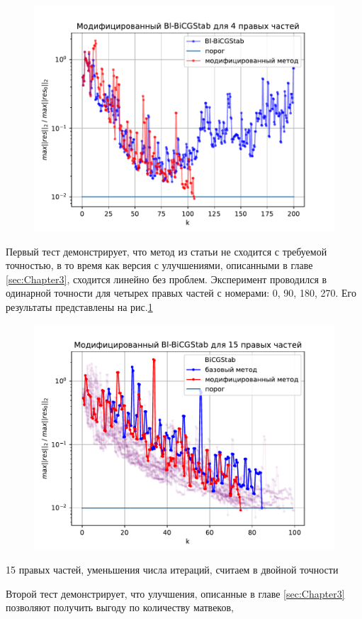 \begin{figure}[H]
    \centering
    \includegraphics[width=0.7\linewidth]{images/4.pdf}
    \caption{}
    \label{fig:4}
\end{figure} 
\par Первый тест демонстрирует, что метод из статьи \cite{elGuennouni2003} не сходится с требуемой точностью, в то время как 
версия с улучшениями, описанными в главе \ref{sec:Chapter3}, сходится линейно без проблем. 
Эксперимент проводился в одинарной точности для четырех правых частей с номерами: 0, 90, 180, 270. Его результаты представлены
на рис.\ref{fig:4}
\begin{figure}[H]
    \centering
    \includegraphics[width=0.7\linewidth]{images/acceleration_15_rhs.pdf}
    \caption{}
    \label{fig:acceleration_15}
\end{figure}
\par 15 правых частей, уменьшения числа итераций, считаем в двойной точности
\par Второй тест демонстрирует, что улучшения, описанные в главе \ref{sec:Chapter3} позволяют получить выгоду по количеству матвеков,
